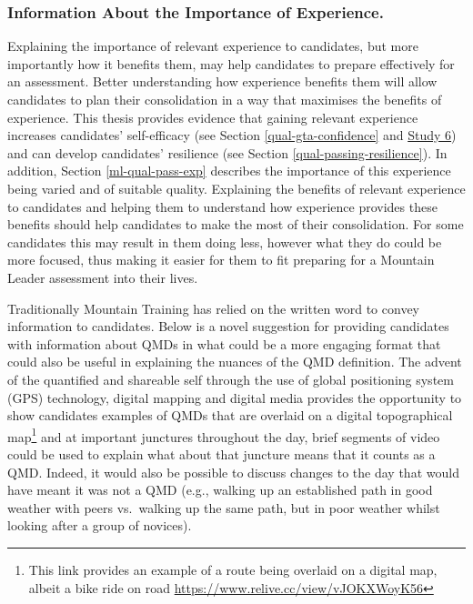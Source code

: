 \documentclass[
  12pt,
  a4paper,
]{book}
\begin{document}
\hypertarget{information-about-the-importance-of-experience.}{%
\subsubsection{Information About the Importance of Experience.}\label{information-about-the-importance-of-experience.}}

Explaining the importance of relevant experience to candidates, but more importantly how it benefits them, may help candidates to prepare effectively for an assessment. Better understanding how experience benefits them will allow candidates to plan their consolidation in a way that maximises the benefits of experience. This thesis provides evidence that gaining relevant experience increases candidates' self-efficacy (see Section \ref{qual-gta-confidence} and \protect\hyperlink{study-6}{Study 6}) and can develop candidates' resilience (see Section \ref{qual-passing-resilience}). In addition, Section \ref{ml-qual-pass-exp} describes the importance of this experience being varied and of suitable quality. Explaining the benefits of relevant experience to candidates and helping them to understand how experience provides these benefits should help candidates to make the most of their consolidation. For some candidates this may result in them doing less, however what they do could be more focused, thus making it easier for them to fit preparing for a Mountain Leader assessment into their lives.

Traditionally Mountain Training has relied on the written word to convey information to candidates. Below is a novel suggestion for providing candidates with information about QMDs in what could be a more engaging format that could also be useful in explaining the nuances of the QMD definition. The advent of the quantified and shareable self through the use of global positioning system (GPS) technology, digital mapping and digital media provides the opportunity to show candidates examples of QMDs that are overlaid on a digital topographical map\footnote{This link provides an example of a route being overlaid on a digital map, albeit a bike ride on road \url{https://www.relive.cc/view/vJOKXWoyK56}} and at important junctures throughout the day, brief segments of video could be used to explain what about that juncture means that it counts as a QMD. Indeed, it would also be possible to discuss changes to the day that would have meant it was not a QMD (e.g., walking up an established path in good weather with peers vs.~walking up the same path, but in poor weather whilst looking after a group of novices).
\end{document}
